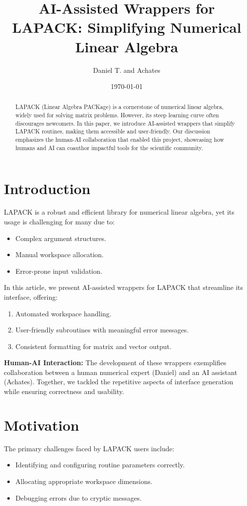 \documentclass[11pt]{article}
\title{AI-Assisted Wrappers for LAPACK: Simplifying Numerical Linear Algebra}
\author{Daniel T. and Achates}
\date{\today}
\begin{document}
\maketitle

\begin{abstract}
    LAPACK (Linear Algebra PACKage) is a cornerstone of numerical linear algebra, widely used for solving matrix problems. However, its steep learning curve often discourages newcomers. In this paper, we introduce AI-assisted wrappers that simplify LAPACK routines, making them accessible and user-friendly. Our discussion emphasizes the human-AI collaboration that enabled this project, showcasing how humans and AI can coauthor impactful tools for the scientific community.
\end{abstract}

\section{Introduction}
LAPACK is a robust and efficient library for numerical linear algebra, yet its usage is challenging for many due to:
\begin{itemize}
    \item Complex argument structures.
    \item Manual workspace allocation.
    \item Error-prone input validation.
\end{itemize}

In this article, we present AI-assisted wrappers for LAPACK that streamline its interface, offering:
\begin{enumerate}
    \item Automated workspace handling.
    \item User-friendly subroutines with meaningful error messages.
    \item Consistent formatting for matrix and vector output.
\end{enumerate}

\textbf{Human-AI Interaction:} The development of these wrappers exemplifies collaboration between a human numerical expert (Daniel) and an AI assistant (Achates). Together, we tackled the repetitive aspects of interface generation while ensuring correctness and usability.

\section{Motivation}
The primary challenges faced by LAPACK users include:
\begin{itemize}
    \item Identifying and configuring routine parameters correctly.
    \item Allocating appropriate workspace dimensions.
    \item Debugging errors due to cryptic messages.
\end{itemize}
\end{document}
